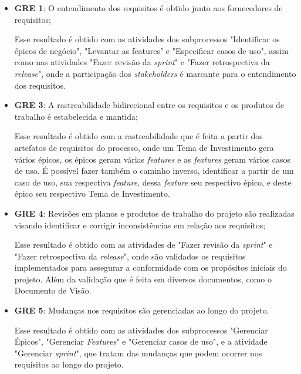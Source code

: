 	  \begin{itemize}
	    
	    \item \textbf{GRE 1}: O entendimento dos requisitos é obtido junto aos fornecedores de requisitos;
	      
	      Esse resultado é obtido com as atividades dos subprocessos "Identificar os épicos de negócio", "Levantar as features" 
	      e "Especificar casos de uso", assim como nas atividades "Fazer revisão da \textit{sprint}" 
	      e "Fazer retrospectiva da \textit{release}", onde a participação dos \textit{stakeholders} é marcante para
	      o entendimento dos requisitos.
		  
	    \item \textbf{GRE 3}: A rastreabilidade bidirecional entre os requisitos e os produtos de trabalho é estabelecida e mantida;
	      
	      Esse resultado é obtido com a rastreabilidade que é feita a partir dos artefatos de requisitos do processo,
	      onde um Tema de Investimento gera vários épicos, os épicos geram várias \textit{features} e 
	      as \textit{features} geram vários casos de uso. É possível fazer também o caminho inverso,
	      identificar a partir de um caso de uso, sua respectiva \textit{feature}, dessa \textit{feature} seu respectivo épico, e 
	      deste épico seu respectivo Tema de Investimento.
	    
	    \item \textbf{GRE 4}: Revisões em planos e produtos de trabalho do projeto são realizadas visando identificar
	      e corrigir inconsistências em relação aos requisitos;
	    
	      Esse resultado é obtido com as atividades de "Fazer revisão da \textit{sprint}" 
	      e "Fazer retrospectiva da \textit{release}", onde são validados os requisitos implementados para assegurar
	      a conformidade com os propósitos iniciais do projeto. Além da validação que é feita em diversos documentos,
	      como o Documento de Visão.
	    
	    \item \textbf{GRE 5}: Mudanças nos requisitos são gerenciadas ao longo do projeto.
	    
	      Esse resultado é obtido com as atividades dos subprocessos "Gerenciar Épicos", "Gerenciar \textit{Features}"  e
	      "Gerenciar casos de uso", e a atividade "Gerenciar \textit{sprint}", que tratam das mudanças que podem ocorrer
	      nos requisitos ao longo do projeto.
	      
	  \end{itemize}


